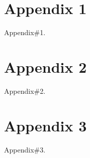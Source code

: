 \section*{Appendix 1}
Appendix\#1.

\section*{Appendix 2}
Appendix\#2.

\section*{Appendix 3}
Appendix\#3.
